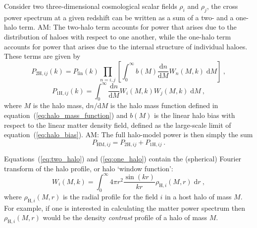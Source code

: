 \documentclass[\docopts]{\docclass}
\newcommand{\elisa}[1]{\textcolor{green!10!orange!90!}{EC: #1}}
\newcommand{\Mead}[1]{\textcolor{red!50!cyan}{AM: #1}}
\begin{document}
Consider two three-dimensional cosmological scalar fields $\rho_i$ and $\rho_j$, the cross power spectrum at a given redshift can be written as a sum of a two- and a one-halo term. \Mead{The two-halo term accounts for power that arises due to the distribution of haloes with respect to one another, while the one-halo term accounts for power that arises due to the internal structure of individual haloes.} These terms are given by
\begin{equation}
P_{2\mathrm{H},ij}(k)=P_{\mathrm{lin}}(k)
\prod_{n=i,j}\left[\int_0^\infty b(M)\frac{\mathrm{d}n}{\mathrm{d}M}W_n(M,k)\;\mathrm{d}M\right]\ ,
\label{eq:two_halo}
\end{equation}
\begin{equation}
P_{1\mathrm{H},ij}(k)=\int_0^\infty \frac{\mathrm{d}n}{\mathrm{d}M}W_i(M,k)W_j(M,k)\;\mathrm{d}M\ ,
\label{eq:one_halo}
\end{equation}
where $M$ is the halo mass, $\mathrm{d}n/\mathrm{d}M$ is the halo mass function defined in equation~(\ref{eq:halo_mass_function}) and $b(M)$ is the linear halo bias with respect to the linear matter density field, defined as the large-scale limit of equation~(\ref{eq:halo_bias}). \Mead{The full halo-model power is then simply the sum
\begin{equation}
P_{\mathrm{HM},ij}=P_{2\mathrm{H},ij}+P_{1\mathrm{H},ij}\ .
\label{eq:halo_model_power}
\end{equation}
}

Equations~(\ref{eq:two_halo}) and (\ref{eq:one_halo}) contain the (spherical) Fourier transform of the halo profile, or halo `window function':
\begin{equation} 
W_i(M,k)=\int_0^\infty4\pi r^2\frac{\sin(kr)}{kr}\rho_{\mathrm{H},i}(M,r)\;\mathrm{d}r\ ,
\label{eq:window_function}
\end{equation}
where $\rho_{\mathrm{H},i}(M,r)$ is the radial profile for the field $i$ in a host halo of mass $M$. For example, if one is interested in calculating the matter power spectrum then $\rho_{\mathrm{H},i}(M,r)$ would be the density \emph{contrast} profile of a halo of mass $M$.

\end{document}
